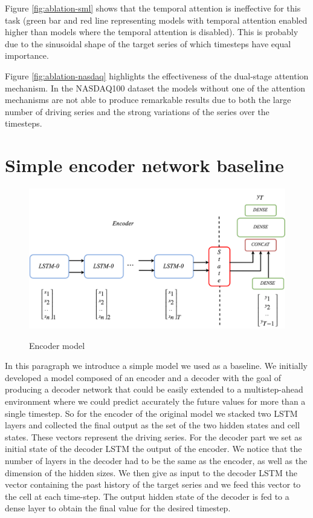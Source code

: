 \documentclass{article}
\begin{document}
Figure \ref{fig:ablation-sml} shows that the temporal attention is
ineffective for this task (green bar and red line representing
models with temporal attention enabled higher than models
where the temporal attention is disabled). This is probably due to the
sinusoidal shape of the target series of which timesteps have equal
importance.

Figure \ref{fig:ablation-nasdaq} highlights the effectiveness of the
dual-stage attention mechanism. In the NASDAQ100 dataset the models
without one of the attention mechanisms are not able to produce
remarkable results due to both the large number of driving series and
the strong variations of the series over the timesteps.

\section{Simple encoder network baseline}

\begin{figure}[ht]
\centering
\includegraphics[width=0.9\linewidth]{ende-rnn-4.png} \\
\caption{Encoder model}
\label{fig:ende-rnn}
\end{figure}


In this paragraph we introduce a simple model we used as a baseline. 
We initially developed a model composed of an encoder and a decoder with the goal 
of producing a decoder network that could be easily extended to a multistep-ahead 
environment where we could predict accurately the future values for more than a 
single timestep.
So for the encoder of the original model we stacked two LSTM layers and collected 
the final output as the set of the two hidden states and cell states. These 
vectors represent the driving series. For the decoder part we set as initial 
state of the decoder LSTM the output of the encoder. 
We notice that the number of layers in the decoder had to be
the same as the encoder, as well as the dimension of the hidden sizes. 
We then give as input to the decoder LSTM the vector containing the past history 
of the target series and we feed this vector to the cell at each time-step. The 
output hidden state of the decoder is fed to a dense layer to obtain the final 
value for the desired timestep.
\end{document}
